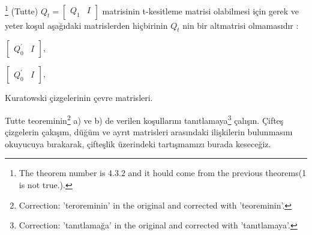 \documentclass[11pt]{amsbook}
\begin{document}
\begin{theorem}\footnote{ The theorem number is 4.3.2 and it hould come from the previous theorems(1 is not true.). }
	(Tutte) \( Q_t = \begin{bmatrix} Q_1 & I \end{bmatrix} \) matrisinin
t-kesitleme matrisi olabilmesi için gerek ve yeter koşul aşağıdaki matrislerden hiçbirinin \( Q_t \) nin bir altmatrisi olmamasıdır :
\begin{hEnumerateAlpha}
    \item 
        \( \begin{bmatrix} Q_0^{\prime} & I \end{bmatrix} \),
    \item 
        \( \begin{bmatrix} Q_0^{\prime} & I \end{bmatrix} \),
    \item 
        Kuratowski çizgelerinin çevre matrisleri. 
\end{hEnumerateAlpha}
\end{theorem}

	Tutte teoreminin\footnote{Correction: 'teroreminin' in the original and corrected with 'teoreminin'. } a) ve b) de verilen koşullarını
tanıtlamaya\footnote{Correction: 'tanıtlamağa' in the original and corrected with 'tanıtlamaya'. } çalışın. Çifteş çizgelerin çakışım,
düğüm ve ayrıt matrisleri arasındaki ilişkilerin bulunmasını okuyucuya bırakarak, çifteşlik üzerindeki tartışmamızı burada keseceğiz. 
\end{document}

